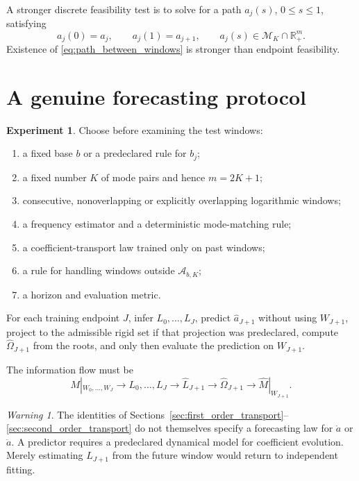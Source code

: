 \documentclass[11pt]{amsart}
\numberwithin{equation}{section}
\theoremstyle{plain}
\theoremstyle{definition}
\newtheorem{experiment}[theorem]{Experiment}
\theoremstyle{remark}
\newtheorem{warning}[theorem]{Warning}
\begin{document}
A stronger discrete feasibility test is to solve for a path $a_j(s)$, $0\leq s\leq1$, satisfying
\begin{equation}
a_j(0)=a_j,
\qquad
a_j(1)=a_{j+1},
\qquad
a_j(s)\in\mathcal M_K\cap\mathbb R_+^m.
\label{eq:path_between_windows}
\end{equation}
Existence of \eqref{eq:path_between_windows} is stronger than endpoint feasibility.

\section{A genuine forecasting protocol}
\label{sec:forecasting_protocol}

\begin{experiment}
\label{exp:window_forecast}
Choose before examining the test windows:
\begin{enumerate}
\item a fixed base $b$ or a predeclared rule for $b_j$;
\item a fixed number $K$ of mode pairs and hence $m=2K+1$;
\item consecutive, nonoverlapping or explicitly overlapping logarithmic windows;
\item a frequency estimator and a deterministic mode-matching rule;
\item a coefficient-transport law trained only on past windows;
\item a rule for handling windows outside $\mathcal A_{b,K}$;
\item a horizon and evaluation metric.
\end{enumerate}
For each training endpoint $J$, infer $L_0,\ldots,L_J$, predict $\widehat a_{J+1}$ without using $W_{J+1}$, project to the admissible rigid set if that projection was predeclared, compute $\widehat\Omega_{J+1}$ from the roots, and only then evaluate the prediction on $W_{J+1}$.
\end{experiment}

The information flow must be
\begin{equation}
M|_{W_0,\ldots,W_J}
\longrightarrow
L_0,\ldots,L_J
\longrightarrow
\widehat L_{J+1}
\longrightarrow
\widehat\Omega_{J+1}
\longrightarrow
\widehat M|_{W_{J+1}}.
\label{eq:forecast_information_flow}
\end{equation}

\begin{warning}
\label{warn:law_required}
The identities of Sections~\ref{sec:first_order_transport}--\ref{sec:second_order_transport} do not themselves specify a forecasting law for $\dot a$ or $\ddot a$.  A predictor requires a predeclared dynamical model for coefficient evolution.  Merely estimating $L_{J+1}$ from the future window would return to independent fitting.
\end{warning}
\end{document}
